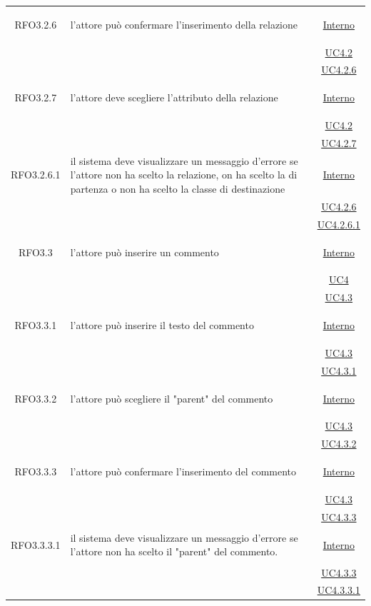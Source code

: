 \begin{longtable}{|c|>{\centering}m{7cm}|c|}
\hypertarget{RFO3.2.6}{RFO3.2.6} & l'attore può confermare l'inserimento della relazione & \hyperlink{Interno}{Interno}\\
& &\hyperref[UC4.2]{UC4.2}\\
& &\hyperref[UC4.2.6]{UC4.2.6}\\ \hline

\hypertarget{RFO3.2.7}{RFO3.2.7} & l'attore deve scegliere l'attributo della relazione & \hyperlink{Interno}{Interno}\\
& &\hyperref[UC4.2]{UC4.2}\\
& &\hyperref[UC4.2.7]{UC4.2.7}\\ \hline

\hypertarget{RFO3.2.6.1}{RFO3.2.6.1} & il sistema deve visualizzare un messaggio d'errore se l'attore non ha scelto la relazione, on ha scelto la di partenza o non ha scelto la classe di destinazione &  \hyperlink{Interno}{Interno}\\
& &\hyperref[UC4.2.6]{UC4.2.6}\\
& &\hyperref[UC4.2.6.1]{UC4.2.6.1}\\ \hline

\hypertarget{RFO3.3}{RFO3.3} & l'attore può inserire un commento &  \hyperlink{Interno}{Interno}\\
& &\hyperref[UC4]{UC4}\\
& &\hyperref[UC4.3]{UC4.3}\\ \hline

\hypertarget{RFO3.3.1}{RFO3.3.1} & l'attore può inserire il testo del commento & \hyperlink{Interno}{Interno}\\
& &\hyperref[UC4.3]{UC4.3}\\
& &\hyperref[UC4.3.1]{UC4.3.1}\\ \hline

\hypertarget{RFO3.3.2}{RFO3.3.2} & l'attore può scegliere il "parent" del commento & \hyperlink{Interno}{Interno}\\
& &\hyperref[UC4.3]{UC4.3}\\
& &\hyperref[UC4.3.2]{UC4.3.2}\\ \hline

\hypertarget{RFO3.3.3}{RFO3.3.3} & l'attore può confermare l'inserimento del commento & \hyperlink{Interno}{Interno}\\
& &\hyperref[UC4.3]{UC4.3}\\
& &\hyperref[UC4.3.3]{UC4.3.3}\\ \hline

\hypertarget{RFO3.3.3.1}{RFO3.3.3.1} & il sistema deve visualizzare un messaggio d'errore se l'attore non ha scelto il "parent" del commento. & \hyperlink{Interno}{Interno}\\
& &\hyperref[UC4.3.3]{UC4.3.3}\\
& &\hyperref[UC4.3.3.1]{UC4.3.3.1}\\ \hline


\end{longtable}
